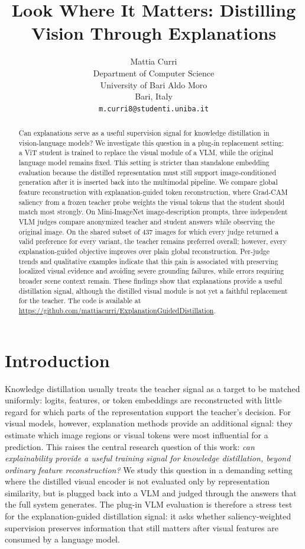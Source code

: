 \documentclass{article}
\title{Look Where It Matters: Distilling Vision Through Explanations}
\author{
  Mattia Curri \\
  Department of Computer Science \\
  University of Bari Aldo Moro \\
  Bari, Italy \\
  \texttt{m.curri8@studenti.uniba.it} \\
}
\begin{document}
\maketitle

\begin{abstract}
Can explanations serve as a useful supervision signal for knowledge distillation in vision-language models?
We investigate this question in a plug-in replacement setting: a ViT student is trained to replace the visual module of a VLM, while the original language model remains fixed.
This setting is stricter than standalone embedding evaluation because the distilled representation must still support image-conditioned generation after it is inserted back into the multimodal pipeline.
We compare global feature reconstruction with explanation-guided token reconstruction, where Grad-CAM saliency from a frozen teacher probe weights the visual tokens that the student should match most strongly.
On Mini-ImageNet image-description prompts, three independent VLM judges compare anonymized teacher and student answers while observing the original image.
On the shared subset of 437 images for which every judge returned a valid preference for every variant, the teacher remains preferred overall; however, every explanation-guided objective improves over plain global reconstruction.
Per-judge trends and qualitative examples indicate that this gain is associated with preserving localized visual evidence and avoiding severe grounding failures, while errors requiring broader scene context remain.
These findings show that explanations provide a useful distillation signal, although the distilled visual module is not yet a faithful replacement for the teacher. The code is available at \url{https://github.com/mattiacurri/ExplanationGuidedDistillation}.
\end{abstract}


\section{Introduction}
\label{sec:intro}

Knowledge distillation usually treats the teacher signal as a target to be matched uniformly: logits, features, or token embeddings are reconstructed with little regard for which parts of the representation support the teacher's decision.
For visual models, however, explanation methods provide an additional signal: they estimate which image regions or visual tokens were most influential for a prediction.
This raises the central research question of this work: \emph{can explainability provide a useful training signal for knowledge distillation, beyond ordinary feature reconstruction?}
We study this question in a demanding setting where the distilled visual encoder is not evaluated only by representation similarity, but is plugged back into a VLM and judged through the answers that the full system generates.
The plug-in VLM evaluation is therefore a stress test for the explanation-guided distillation signal: it asks whether saliency-weighted supervision preserves information that still matters after visual features are consumed by a language model.
\end{document}
